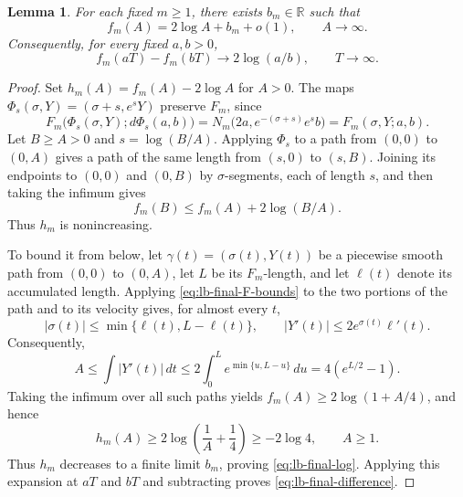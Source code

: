 \documentclass[11pt]{article}
\newtheorem{lemma}[theorem]{Lemma}
\theoremstyle{definition}
\begin{document}
\begin{lemma}\label{lem:lb-final-log}
For each fixed $m\geq1$, there exists $b_m\in\mathbb R$ such that
\begin{equation}\label{eq:lb-final-log}
 f_m(A)=2\log A+b_m+o(1),
 \qquad A\to\infty.
\end{equation}
Consequently, for every fixed $a,b>0$,
\begin{equation}\label{eq:lb-final-difference}
 f_m(aT)-f_m(bT)\longrightarrow2\log(a/b),
 \qquad T\to\infty.
\end{equation}
\end{lemma}
\begin{proof}
Set $h_m(A)=f_m(A)-2\log A$ for $A>0$. The maps
$\Phi_s(\sigma,Y)=(\sigma+s,e^sY)$ preserve $F_m$, since
\[
 F_m\bigl(\Phi_s(\sigma,Y);d\Phi_s(a,b)\bigr)
 =N_m\bigl(2a,e^{-(\sigma+s)}e^sb\bigr)
 =F_m(\sigma,Y;a,b).
\]
Let $B\geq A>0$ and $s=\log(B/A)$. Applying $\Phi_s$ to a path from
$(0,0)$ to $(0,A)$ gives a path of the same length from $(s,0)$ to $(s,B)$.
Joining its endpoints to $(0,0)$ and $(0,B)$ by $\sigma$-segments, each of
length $s$, and then taking the infimum gives
\[
 f_m(B)\leq f_m(A)+2\log(B/A).
\]
Thus $h_m$ is nonincreasing.

To bound it from below, let $\gamma(t)=(\sigma(t),Y(t))$ be a piecewise
smooth path from $(0,0)$ to $(0,A)$, let $L$ be its $F_m$-length, and let
$\ell(t)$ denote its accumulated length. Applying
\eqref{eq:lb-final-F-bounds} to the two portions of the path and to its
velocity gives, for almost every $t$,
\[
 |\sigma(t)|\leq\min\{\ell(t),L-\ell(t)\},
 \qquad
 |Y'(t)|\leq2e^{\sigma(t)}\ell'(t).
\]
Consequently,
\[
 A\leq\int|Y'(t)|\,dt
 \leq2\int_0^L e^{\min\{u,L-u\}}\,du
 =4(e^{L/2}-1).
\]
Taking the infimum over all such paths yields
$f_m(A)\geq2\log(1+A/4)$, and hence
\[
h_m(A)\geq2\log\left(\frac1A +\frac 14\right)
 \geq-2\log4,
 \qquad A\geq1.
\]
Thus $h_m$ decreases to a finite limit $b_m$, proving
\eqref{eq:lb-final-log}. Applying this expansion at $aT$ and $bT$ and
subtracting proves \eqref{eq:lb-final-difference}.
\end{proof}
\end{document}
